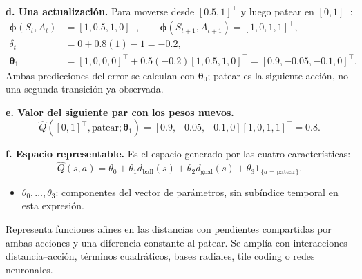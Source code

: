 \textbf{d. Una actualización.} Para moverse desde $[0.5,1]^{\top}$ y luego patear en $[0,1]^{\top}$:
\begin{equation}\label{eq:robot-update}
\begin{aligned}
    \boldsymbol{\phi}(S_t,A_t)&=[1,0.5,1,0]^{\top},\qquad
    \boldsymbol{\phi}(S_{t+1},A_{t+1})=[1,0,1,1]^{\top},\\
    \delta_t&=0+0.8(1)-1=-0.2,\\
    \boldsymbol{\theta}_1&=[1,0,0,0]^{\top}+0.5(-0.2)[1,0.5,1,0]^{\top}
                         =[0.9,-0.05,-0.1,0]^{\top}.
\end{aligned}
\end{equation}
Ambas predicciones del error se calculan con $\boldsymbol{\theta}_0$; patear es la siguiente acción, no una segunda transición ya observada.

\textbf{e. Valor del siguiente par con los pesos nuevos.}
\begin{equation}\label{eq:robot-next-value}
    \hat Q([0,1]^{\top},\mathrm{patear};\boldsymbol{\theta}_1)
    =[0.9,-0.05,-0.1,0][1,0,1,1]^{\top}=0.8.
\end{equation}

\textbf{f. Espacio representable.} Es el espacio generado por las cuatro características:
\begin{equation}\label{eq:robot-function-space}
    \hat Q(s,a)=\theta_0+\theta_1d_{\mathrm{ball}}(s)
    +\theta_2d_{\mathrm{goal}}(s)+\theta_3\mathbf{1}_{\{a=\mathrm{patear}\}}.
\end{equation}
\begin{itemize}
    \item $\theta_0,\ldots,\theta_3$: componentes del vector de parámetros, sin subíndice temporal en esta expresión.
\end{itemize}
Representa funciones afines en las distancias con pendientes compartidas por ambas acciones y una diferencia constante al patear. Se amplía con interacciones distancia--acción, términos cuadráticos, bases radiales, tile coding o redes neuronales.
